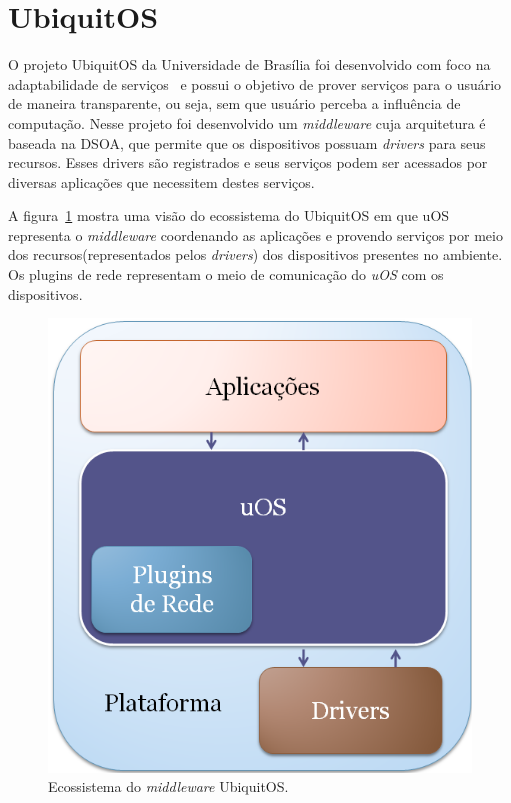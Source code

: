 \section{UbiquitOS}

O projeto UbiquitOS da Universidade de Brasília foi desenvolvido com foco na adaptabilidade de serviços~\cite{gomes2007} e possui o objetivo de prover serviços para o usuário de maneira transparente, ou seja, sem que usuário perceba a influência de computação. Nesse projeto foi desenvolvido um \emph{middleware} cuja arquitetura é baseada na DSOA, que permite que os dispositivos possuam \emph{drivers} para seus recursos. Esses drivers são registrados e seus serviços podem ser acessados por diversas aplicações que necessitem destes serviços.

A figura~\ref{fig:ubiquitos} mostra uma visão do ecossistema do UbiquitOS em que uOS representa o \emph{middleware} coordenando as aplicações e provendo serviços por meio dos recursos(representados pelos \emph{drivers}) dos dispositivos presentes no ambiente. Os plugins de rede representam o meio de comunicação do \emph{uOS} com os dispositivos.

\begin{figure}[ht]
	\center
	\includegraphics[scale=0.4]{imagens/ecossistemaUbiquitos}
	\caption{Ecossistema do \emph{middleware} UbiquitOS.}
	\label{fig:ubiquitos}
\end{figure}




